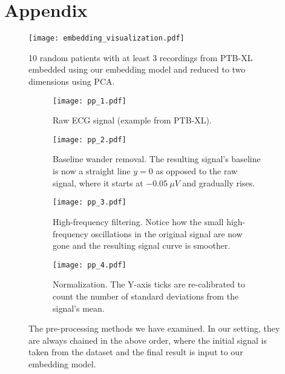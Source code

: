 \documentclass[preprint,12pt]{elsarticle}
\begin{document}
\clearpage
\appendix

\section{Appendix}

\begin{figure}[h]
    \centering
    \texttt{[image: embedding\_visualization.pdf]}
    \caption{10 random patients with at least 3 recordings from PTB-XL embedded using our embedding model and reduced to two dimensions using PCA.}
    \label{fig:pca-embeddings}
\end{figure}

\begin{figure}[h]
    \centering
    \begin{subfigure}[b]{0.45\textwidth}
    \centering
    \texttt{[image: pp\_1.pdf]}
    \caption{Raw ECG signal (example from PTB-XL).}
    \vspace{2.1em}
    \label{fig:pp1}
    \end{subfigure}
    \hfill
    \begin{subfigure}[b]{0.45\textwidth}
    \centering
    \texttt{[image: pp\_2.pdf]}
    \caption{Baseline wander removal. The resulting signal's baseline is now a straight line $y=0$ as opposed to the raw signal, where it starts at $-0.05\ \mu V$ and gradually rises. }
    \label{fig:pp2}
    \end{subfigure}    
    \begin{subfigure}[b]{0.45\textwidth}
    \centering
    \texttt{[image: pp\_3.pdf]}
    \caption{High-frequency filtering. Notice how the small high-frequency oscillations in the original signal are now gone and the resulting signal curve is smoother. }
    \label{fig:pp3}
    \end{subfigure}
    \hfill
    \begin{subfigure}[b]{0.45\textwidth}
    \centering
    \texttt{[image: pp\_4.pdf]}
    \caption{Normalization. The Y-axis ticks are re-calibrated to count the number of standard deviations from the signal's mean.}
    \vspace{0.9em}
    \label{fig:pp4}
    \end{subfigure}
    \caption{The pre-processing methods we have examined. In our setting, they are always chained in the above order, where the initial signal is taken from the dataset and the final result is input to our embedding model.}
    \label{fig:preprocessing}
\end{figure}
\end{document}
